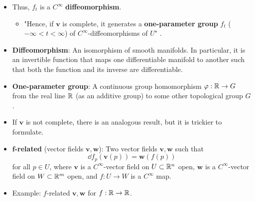 \documentclass[../notes.tex]{subfiles}
\begin{document}
\begin{itemize}
\begin{enumerate}
\begin{proof}
            See property 4.
        \end{proof}
    \end{enumerate}
    \item Thus, $f_t$ is a $C^\infty$ \textbf{diffeomorphism}.
    \begin{itemize}
        \item "Hence, if $\bm{v}$ is complete, it generates a \textbf{one-parameter group} $f_t$ ($-\infty<t<\infty$) of $C^\infty$-diffeomorphisms of $U$" \parencite[40]{bib:DifferentialForms}.
    \end{itemize}
    \item \textbf{Diffeomorphism}: An isomorphism of smooth manifolds. In particular, it is an invertible function that maps one differentiable manifold to another such that both the function and its inverse are differentiable.
    \item \textbf{One-parameter group}: A continuous group homomorphism $\varphi:\mathbb{R}\to G$ from the real line $\mathbb{R}$ (as an additive group) to some other topological group $G$.
    \item If $\bm{v}$ is not complete, there is an analogous result, but it is trickier to formulate.
    \item \textbf{$\bm{f}$-related} (vector fields $\bm{v},\bm{w}$): Two vector fields $\bm{v},\bm{w}$ such that
    \begin{equation*}
        \dd f_p(\bm{v}(p)) = \bm{w}(f(p))
    \end{equation*}
    for all $p\in U$, where $\bm{v}$ is a $C^\infty$-vector field on $U\subset\mathbb{R}^n$ open, $\bm{w}$ is a $C^\infty$-vector field on $W\subset\mathbb{R}^m$ open, and $f:U\to W$ is a $C^\infty$ map.
    \item Example: $f$-related $\bm{v},\bm{w}$ for $f:\mathbb{R}\to\mathbb{R}$.
    \begin{figure}[h!]
        \centering
        \footnotesize
\end{figure}
\end{itemize}
\end{document}
